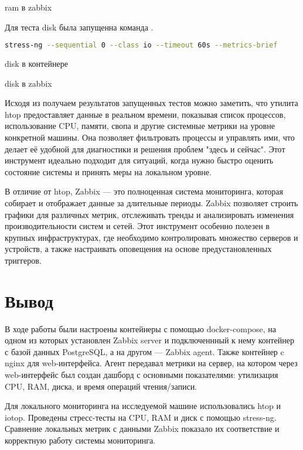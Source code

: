 \begin{image}
    \caption{ram в zabbix}
    \label{fig:test:ram:zab}
\end{image}

Для теста disk была запущенна команда .

\begin{lstlisting}[language=bash]
stress-ng --sequential 0 --class io --timeout 60s --metrics-brief
\end{lstlisting}

\begin{image}
    \caption{disk в контейнере}
    \label{fig:test:io}
\end{image}

\begin{image}
    \caption{disk в zabbix}
    \label{fig:test:io:zab}
\end{image}

\break

Исходя из получаем результатов запущенных тестов можно заметить, что
утилита htop предоставляет данные в реальном времени,
показывая список процессов, использование CPU, памяти, свопа
и другие системные метрики на уровне конкретной машины.
Она позволяет фильтровать процессы и управлять ими,
что делает её удобной для диагностики и решения проблем "здесь и сейчас".
Этот инструмент идеально подходит для ситуаций,
когда нужно быстро оценить состояние системы
и принять меры на локальном уровне.\par
В отличие от htop, Zabbix --- это полноценная система мониторинга,
которая собирает и отображает данные за длительные периоды.
Zabbix позволяет строить графики для различных метрик,
отслеживать тренды и анализировать изменения производительности систем и сетей.
Этот инструмент особенно полезен в крупных инфраструктурах,
где необходимо контролировать множество серверов и устройств,
а также настраивать оповещения на основе предустановленных триггеров.

\clearpage

\section*{\LARGE Вывод}
В ходе работы были настроены контейнеры с помощью docker-compose,
на одном из которых установлен Zabbix server
и подключеннный к нему контейнер с базой данных PostgreSQL,
а на другом --- Zabbix agent. Также контейнер c nginx для web-интерфейса.
Агент передавал метрики на сервер,
на котором через web-интерфейс был создан дашборд с основными показателями:
утилизация CPU, RAM, диска, и время операций чтения/записи.\par
Для локального мониторинга на исследуемой машине использовались htop и iotop.
Проведены стресс-тесты на CPU, RAM и диск с помощью stress-ng.
Сравнение локальных метрик с данными Zabbix показало их соответствие
и корректную работу системы мониторинга.


